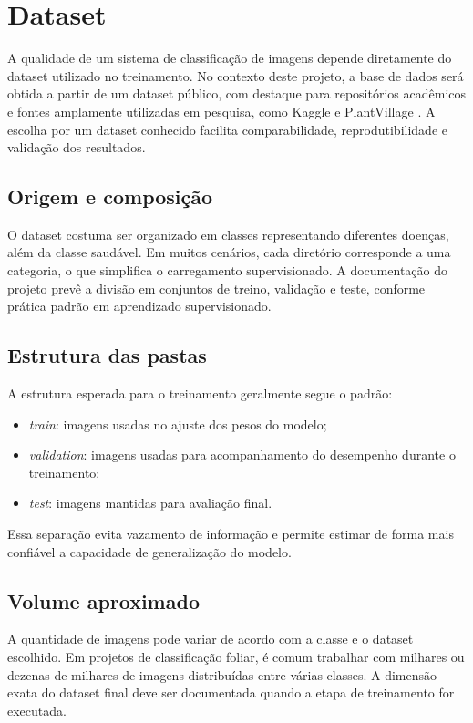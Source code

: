 \chapter{Dataset}

A qualidade de um sistema de classificação de imagens depende diretamente do dataset utilizado no treinamento. No contexto deste projeto, a base de dados será obtida a partir de um dataset público, com destaque para repositórios acadêmicos e fontes amplamente utilizadas em pesquisa, como Kaggle e PlantVillage \cite{kaggle,plantvillage}. A escolha por um dataset conhecido facilita comparabilidade, reprodutibilidade e validação dos resultados.

\section{Origem e composição}

O dataset costuma ser organizado em classes representando diferentes doenças, além da classe saudável. Em muitos cenários, cada diretório corresponde a uma categoria, o que simplifica o carregamento supervisionado. A documentação do projeto prevê a divisão em conjuntos de treino, validação e teste, conforme prática padrão em aprendizado supervisionado.

\section{Estrutura das pastas}

A estrutura esperada para o treinamento geralmente segue o padrão:
\begin{itemize}
    \item \textit{train}: imagens usadas no ajuste dos pesos do modelo;
    \item \textit{validation}: imagens usadas para acompanhamento do desempenho durante o treinamento;
    \item \textit{test}: imagens mantidas para avaliação final.
\end{itemize}

Essa separação evita vazamento de informação e permite estimar de forma mais confiável a capacidade de generalização do modelo.

\section{Volume aproximado}

A quantidade de imagens pode variar de acordo com a classe e o dataset escolhido. Em projetos de classificação foliar, é comum trabalhar com milhares ou dezenas de milhares de imagens distribuídas entre várias classes. A dimensão exata do dataset final deve ser documentada quando a etapa de treinamento for executada.

